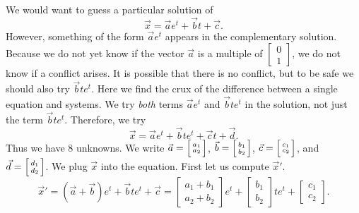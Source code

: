\begin{example}
We would want to guess a particular solution of
\begin{equation*}
\vec{x} = 
\vec{a}
e^{t}
+
\vec{b}
t +
\vec{c} .
\end{equation*}
However, something of the form $\vec{a} e^t$ appears in the complementary
solution.  Because we do not yet know if the vector $\vec{a}$
is a multiple of $\left[ \begin{smallmatrix}
0 \\
1
\end{smallmatrix} \right]$, we do not know if a conflict
arises.  It is possible that there is no conflict,
but to be safe we should also try
$\vec{b} t e^t$.
Here we find
the crux of the difference between a single equation and systems.  We try
\emph{both} terms $\vec{a} e^t$ and $\vec{b} t e^t$ in the solution,
not just the term $\vec{b} t e^t$.
Therefore, we try
\begin{equation*}
\vec{x} = 
\vec{a}
e^{t}
+
\vec{b}
t
e^{t}
+
\vec{c}
t +
\vec{d}.
\end{equation*}
Thus we have 8 unknowns.  We write
$\vec{a} =
\Bigl[ \begin{smallmatrix} a_1 \\ a_2 \end{smallmatrix} \Bigr]$,
$\vec{b} =
\Bigl[ \begin{smallmatrix} b_1 \\ b_2 \end{smallmatrix} \Bigr]$,
$\vec{c} =
\Bigl[ \begin{smallmatrix} c_1 \\ c_2 \end{smallmatrix} \Bigr]$,
and
$\vec{d} =
\Bigl[ \begin{smallmatrix} d_1 \\ d_2 \end{smallmatrix} \Bigr]$.
We plug $\vec{x}$ into the equation.  First
let us compute ${\vec{x}}'$.
\begin{equation*}
{\vec{x}}' = 
\left( \vec{a} + \vec{b} \right)
e^{t}
+
\vec{b}
t
e^{t}
+
\vec{c} =
\begin{bmatrix}
a_1 + b_1 \\ a_2+b_2
\end{bmatrix}
e^{t}
+
\begin{bmatrix}
b_1 \\ b_2
\end{bmatrix}
t e^{t}
+
\begin{bmatrix}
c_1 \\ c_2
\end{bmatrix} .

\end{equation*}
\end{example}
